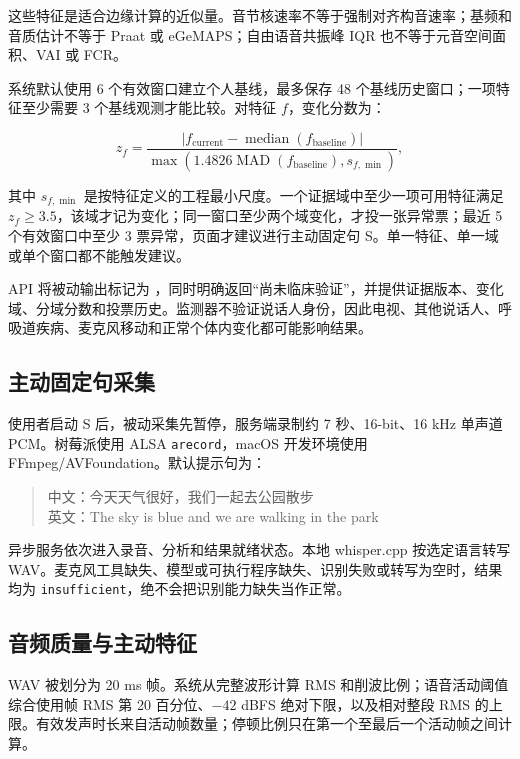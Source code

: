 \documentclass[11pt,a4paper]{article}
\begin{document}
这些特征是适合边缘计算的近似量。音节核速率不等于强制对齐构音速率；基频和音质估计不等于 Praat 或 eGeMAPS；自由语音共振峰 IQR 也不等于元音空间面积、VAI 或 FCR。

系统默认使用 6 个有效窗口建立个人基线，最多保存 48 个基线历史窗口；一项特征至少需要 3 个基线观测才能比较。对特征 $f$，变化分数为：

\begin{equation}
z_f=\frac{|f_{\mathrm{current}}-\operatorname{median}(f_{\mathrm{baseline}})|}
{\max\left(1.4826\operatorname{MAD}(f_{\mathrm{baseline}}),s_{f,\min}\right)},
\end{equation}

其中 $s_{f,\min}$ 是按特征定义的工程最小尺度。一个证据域中至少一项可用特征满足 $z_f\geq3.5$，该域才记为变化；同一窗口至少两个域变化，才投一张异常票；最近 5 个有效窗口中至少 3 票异常，页面才建议进行主动固定句 S。单一特征、单一域或单个窗口都不能触发建议。

API 将被动输出标记为 ，同时明确返回“尚未临床验证”，并提供证据版本、变化域、分域分数和投票历史。监测器不验证说话人身份，因此电视、其他说话人、呼吸道疾病、麦克风移动和正常个体内变化都可能影响结果。

\subsection{主动固定句采集}

使用者启动 S 后，被动采集先暂停，服务端录制约 7 秒、16-bit、16 kHz 单声道 PCM。树莓派使用 ALSA \texttt{arecord}，macOS 开发环境使用 FFmpeg/AVFoundation。默认提示句为：

\begin{quote}
中文：今天天气很好，我们一起去公园散步\\
英文：The sky is blue and we are walking in the park
\end{quote}

异步服务依次进入录音、分析和结果就绪状态。本地 whisper.cpp 按选定语言转写 WAV。麦克风工具缺失、模型或可执行程序缺失、识别失败或转写为空时，结果均为 \texttt{insufficient}，绝不会把识别能力缺失当作正常。

\subsection{音频质量与主动特征}

WAV 被划分为 20 ms 帧。系统从完整波形计算 RMS 和削波比例；语音活动阈值综合使用帧 RMS 第 20 百分位、$-42$ dBFS 绝对下限，以及相对整段 RMS 的上限。有效发声时长来自活动帧数量；停顿比例只在第一个至最后一个活动帧之间计算。
\end{document}
